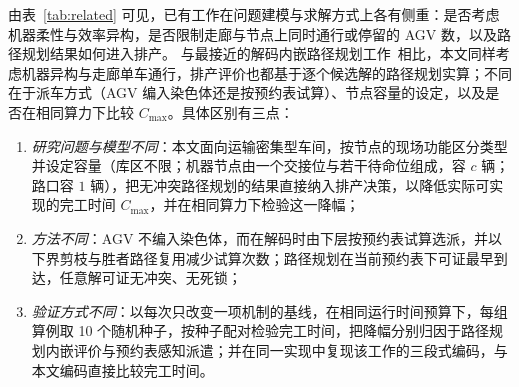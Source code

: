\documentclass[manuscript,screen,review]{acmart}
\newcommand{\NSeeds}{10}
\begin{document}
由表~\ref{tab:related} 可见，已有工作在问题建模与求解方式上各有侧重：是否考虑机器柔性与效率异构，是否限制走廊与节点上同时通行或停留的 AGV 数，以及路径规划结果如何进入排产。
与最接近的解码内嵌路径规划工作~\cite{lyu2019approach}相比，本文同样考虑机器异构与走廊单车通行，排产评价也都基于逐个候选解的路径规划实算；不同在于派车方式（AGV 编入染色体还是按预约表试算）、节点容量的设定，以及是否在相同算力下比较 $C_{\max}$。具体区别有三点：
\begin{enumerate}[label=(\arabic*),leftmargin=*,topsep=2pt,itemsep=1pt]
  \item \emph{研究问题与模型不同}：本文面向运输密集型车间，按节点的现场功能区分类型并设定容量（库区不限；机器节点由一个交接位与若干待命位组成，容 $c$ 辆；路口容 $1$ 辆），把无冲突路径规划的结果直接纳入排产决策，以降低实际可实现的完工时间 $C_{\max}$，并在相同算力下检验这一降幅；
  \item \emph{方法不同}：AGV 不编入染色体，而在解码时由下层按预约表试算选派，并以下界剪枝与胜者路径复用减少试算次数；路径规划在当前预约表下可证最早到达，任意解可证无冲突、无死锁；
  \item \emph{验证方式不同}：以每次只改变一项机制的基线，在相同运行时间预算下，每组算例取 \NSeeds{} 个随机种子，按种子配对检验完工时间，把降幅分别归因于路径规划内嵌评价与预约表感知派遣；并在同一实现中复现该工作的三段式编码，与本文编码直接比较完工时间。
\end{enumerate}
\end{document}
